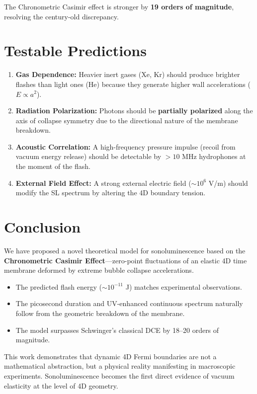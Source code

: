 \documentclass[12pt,a4paper]{article}
\begin{document}
The Chronometric Casimir effect is stronger by \textbf{19 orders of magnitude}, resolving the century-old discrepancy.

\section{Testable Predictions}

\begin{enumerate}
    \item \textbf{Gas Dependence:} Heavier inert gases (Xe, Kr) should produce brighter flashes than light ones (He) because they generate higher wall accelerations ($E \propto a^2$).
    \item \textbf{Radiation Polarization:} Photons should be \textbf{partially polarized} along the axis of collapse symmetry due to the directional nature of the membrane breakdown.
    \item \textbf{Acoustic Correlation:} A high-frequency pressure impulse (recoil from vacuum energy release) should be detectable by $>10$ MHz hydrophones at the moment of the flash.
    \item \textbf{External Field Effect:} A strong external electric field ($\sim 10^6$ V/m) should modify the SL spectrum by altering the 4D boundary tension.
\end{enumerate}

\section{Conclusion}

We have proposed a novel theoretical model for sonoluminescence based on the \textbf{Chronometric Casimir Effect}—zero-point fluctuations of an elastic 4D time membrane deformed by extreme bubble collapse accelerations. 
\begin{itemize}
    \item The predicted flash energy ($\sim 10^{-11}$ J) matches experimental observations.
    \item The picosecond duration and UV-enhanced continuous spectrum naturally follow from the geometric breakdown of the membrane.
    \item The model surpasses Schwinger's classical DCE by 18--20 orders of magnitude.
\end{itemize}
This work demonstrates that dynamic 4D Fermi boundaries are not a mathematical abstraction, but a physical reality manifesting in macroscopic experiments. Sonoluminescence becomes the first direct evidence of vacuum elasticity at the level of 4D geometry.
\end{document}
